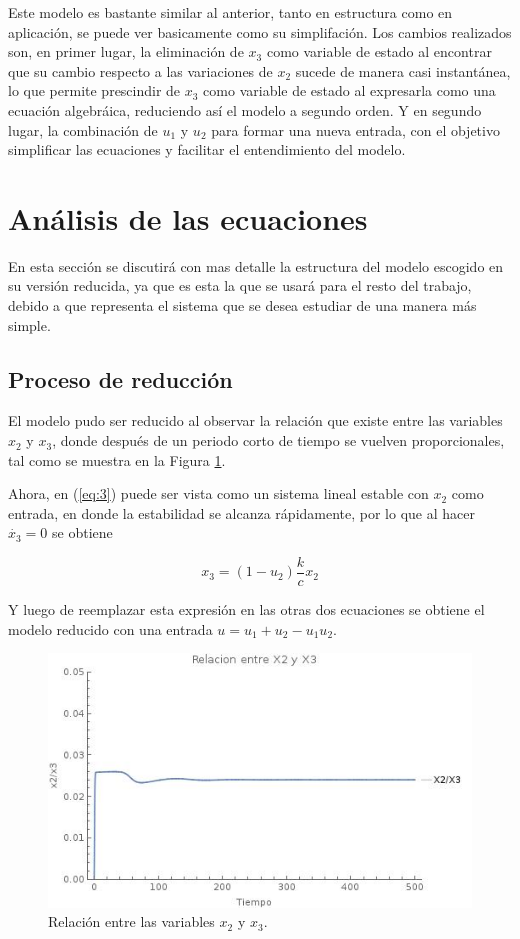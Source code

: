 \documentclass{article}
\begin{document}
Este modelo es bastante similar al anterior, tanto en estructura como en
aplicación, se puede ver basicamente como su simplifación. Los cambios
realizados son, en primer lugar, la eliminación de $x_3$ como variable de
estado al encontrar que su cambio respecto a las variaciones de $x_2$ sucede de
manera casi instantánea, lo que permite prescindir de $x_3$ como variable de
estado al expresarla como una ecuación algebráica, reduciendo así el modelo a
segundo orden.  Y en segundo lugar, la combinación de $u_1$ y $u_2$ para formar una
nueva entrada, con el objetivo simplificar las ecuaciones y facilitar el
entendimiento del modelo.

\section{Análisis de las ecuaciones}

En esta sección se discutirá con mas detalle la estructura del modelo escogido
en su versión reducida, ya que es esta la que se usará para el resto del trabajo,
debido a que representa el sistema que se desea estudiar de una manera más simple.

    \subsection{Proceso de reducción}

    El modelo pudo ser reducido al observar la relación que existe
    entre las variables $x_2$ y $x_3$, donde después de un periodo corto de
    tiempo se vuelven proporcionales, tal como se muestra en la Figura \ref{fig:relacion}.

    Ahora, en (\ref{eq:3}) puede ser vista como un sistema lineal estable con
    $x_2$ como entrada, en donde la estabilidad se alcanza rápidamente, por lo
    que al hacer $\dot{x_3} = 0$ se obtiene

    \Large
    $$x_3 = (1-u_2) \frac{k}{c} x_2$$
    \normalsize

    Y luego de reemplazar esta expresión en las otras dos ecuaciones se obtiene el
    modelo reducido con una entrada $u = u_1 + u_2 - u_1 u_2$.

    \begin{figure}[h!]
        \centering
        \includegraphics[scale=0.5]{Images/Vih-x2-x3}
        \caption{Relación entre las variables $x_2$ y $x_3$.}
        \label{fig:relacion}
    \end{figure}
\end{document}
